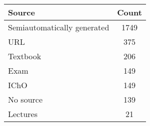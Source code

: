 \begin{tabular}{lc}
\toprule
Source & Count \\
\midrule
Semiautomatically generated & 1749 \\
URL & 375 \\
Textbook & 206 \\
Exam & 149 \\
IChO & 149 \\
No source & 139 \\
Lectures & 21 \\
\bottomrule
\end{tabular}
